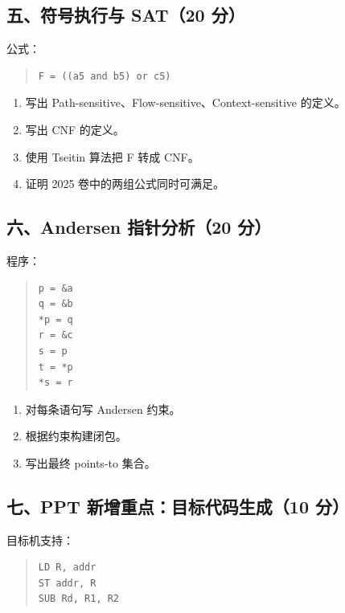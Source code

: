 \documentclass[UTF8,zihao=-4]{ctexart}
\begin{document}
\subsection{五、符号执行与 SAT（20 分）}


公式：


\begin{quote}
\footnotesize
\begin{verbatim}
F = ((a5 and b5) or c5)
\end{verbatim}
\end{quote}


\begin{enumerate}
\item 写出 Path-sensitive、Flow-sensitive、Context-sensitive 的定义。
\item 写出 CNF 的定义。
\item 使用 Tseitin 算法把 F 转成 CNF。
\item 证明 2025 卷中的两组公式同时可满足。
\end{enumerate}


\subsection{六、Andersen 指针分析（20 分）}


程序：


\begin{quote}
\footnotesize
\begin{verbatim}
p = &a
q = &b
*p = q
r = &c
s = p
t = *p
*s = r
\end{verbatim}
\end{quote}


\begin{enumerate}
\item 对每条语句写 Andersen 约束。
\item 根据约束构建闭包。
\item 写出最终 points-to 集合。
\end{enumerate}


\subsection{七、PPT 新增重点：目标代码生成（10 分）}


目标机支持：

\begin{quote}
\footnotesize
\begin{verbatim}
LD R, addr
ST addr, R
SUB Rd, R1, R2
\end{verbatim}
\end{quote}
\end{document}
